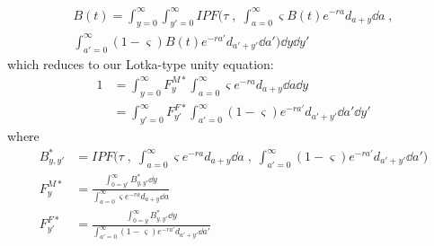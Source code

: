 \begin{equation}
\label{eq:ex2sexIPFunity3}
\begin{split}
B(t) = \int _{y=0}^\infty \int _{y'=0}^\infty IPF\Bigg(\tau\;,\;
 \int_{a=0}^\infty \varsigma B(t) e^{-ra}d_{a+y} \dd a\;, \\ 
 \int_{a'=0}^\infty (1-\varsigma) B(t)e^{-ra'}d_{a'+y'} \dd a'\Bigg) \dd y \dd
 y'
\end{split}
\end{equation}
which reduces to our Lotka-type unity equation:
\begin{align}
\label{eq:ex2sexIPFunity3}
1 &= \int _{y=0}^\infty F_{y}^{M\ast} \int_{a=0}^\infty \varsigma e^{-ra}d_{a+y}
\dd a \dd y \\ 
&= \int _{y'=0}^\infty F_{y'}^{F\ast} \int_{a'=0}^\infty
(1-\varsigma) e^{-ra'}d_{a'+y'} \dd a' \dd y'
\end{align}
where
\begin{align}
B_{y,y'}^\ast &= IPF\Bigg(\tau\;,\;
 \int_{a=0}^\infty \varsigma e^{-ra}d_{a+y} \dd a\;,\;
 \int_{a'=0}^\infty (1-\varsigma) e^{-ra'}d_{a'+y'} \dd a'\Bigg) \\
F_{y}^{M\ast} &= \frac{\int_{0=y'}^\infty B_{y,y'}^\ast \dd
y}{\int_{a=0}^\infty\varsigma e^{-ra}d_{a+y} \dd a} \\
F_{y'}^{F\ast} &= \frac{\int_{0=y}^\infty B_{y,y'}^\ast \dd
y}{\int_{a'=0}^\infty (1-\varsigma) e^{-ra'}d_{a'+y'} \dd a'} 
\end{align}




